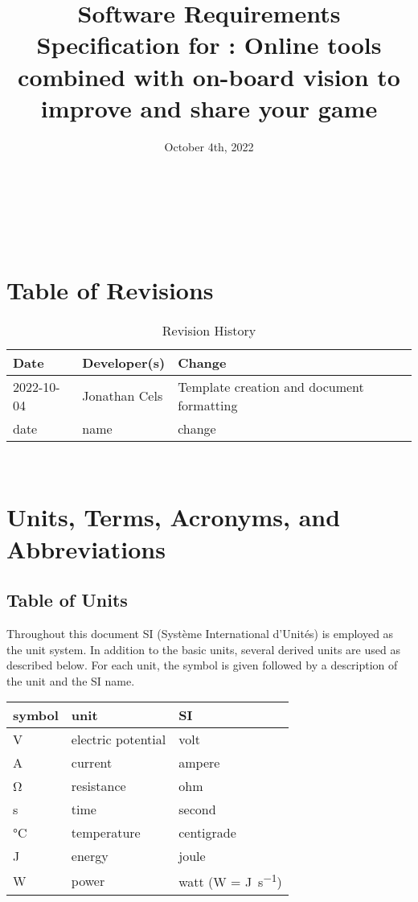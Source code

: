\documentclass[12pt]{article}
\begin{document}
\title{Software Requirements Specification for \progname{}: Online tools combined with on-board vision to improve and share your game} 
\author{\authname}
\date{October 4th, 2022}
	
\maketitle

~\newpage

\tableofcontents

~\newpage

\section*{Table of Revisions}
\begin{table}[hp]
\caption{Revision History} \label{TblRevisionHistory}
\begin{tabularx}{\textwidth}{llX}
\toprule
\textbf{Date} & \textbf{Developer(s)} & \textbf{Change}\\
\midrule
2022-10-04 & Jonathan Cels & Template creation and document formatting\\ 
date & name & change\\
\bottomrule
\end{tabularx}
\end{table}

~\newpage

\section{Units, Terms, Acronyms, and Abbreviations}

\subsection{Table of Units}
Throughout this document SI (Syst\`{e}me International d'Unit\'{e}s) is employed
as the unit system.  In addition to the basic units, several derived units are
used as described below.  For each unit, the symbol is given followed by a
description of the unit and the SI name.

\begin{table}[ht]
  \noindent \begin{tabular}{l l l} 
    \toprule		
    \textbf{symbol} & \textbf{unit} & \textbf{SI}\\
    \midrule 
    \si{\volt} & electric potential & volt\\
    \si{\ampere} & current	& ampere\\
    \si{\ohm} & resistance	& ohm\\
    \si{\second} & time & second\\
    \si{\celsius} & temperature & centigrade\\
    \si{\joule} & energy & joule\\
    \si{\watt} & power & watt (W = \si{\joule\per\second})\\
    \bottomrule
  \end{tabular}
\end{table}
\end{document}
